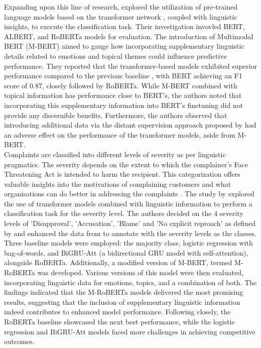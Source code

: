 Expanding upon this line of research, \cite{jin_complaint_2020} explored the utilization of pre-trained language models based on the transformer network \cite{vaswaniAttentionAllYou2023a}, coupled with linguistic insights, to execute the classification task. Their investigation invovled BERT, ALBERT, and RoBERTa models for evaluation. The introduction of Multimodal BERT (M-BERT) aimed to gauge how incorporating supplementary linguistic details related to emotions and topical themes could influence predictive performance. They reported that the transformer-based models exhibited superior performance compared to the previous baseline \cite{preotiuc-pietro_automatically_2019}, with BERT achieving an F1 score of 0.87, closely followed by RoBERTa. While M-BERT combined with topical information has performance close to BERT's, the authors noted that incorporating this supplementary information into BERT's finetuning did not provide any discernible benefits. Furthermore, the authors observed that introducing additional data via the distant supervision approach proposed by \cite{preotiuc-pietro_automatically_2019} had an adverse effect on the performance of the transformer models, aside from M-BERT.\\

Complaints are classified into different levels of severity as per linguistic pragmatics. The severity depends on the extent to which the complainer's Face Threatening Act is intended to harm the recipient. This categorization offers valuable insights into the motivations of complaining customers and what organisations can do better in addressing the complaints \cite{jinModelingSeverityComplaints2021}. The study by \cite{jinModelingSeverityComplaints2021} explored the use of transformer models combined with linguistic information to perform a classification task for the severity level. The authors decided on the 4 severity levels of 'Disapproval', 'Accusation', 'Blame' and 'No explicit reproach' as defined by \cite{trosborg2011interlanguage} and enhanced the data from \cite{preotiuc-pietro_automatically_2019} to annotate with the severity levels as the classes. Three baseline models were employed: the majority class, logistic regression with bag-of-words, and BiGRU-Att (a bidirectional GRU model with self-attention), alongside RoBERTa. Additionally, a modified version of M-BERT, termed M-RoBERTa was developed. Various versions of this model were then evaluated, incorporating linguistic data for emotions, topics, and a combination of both. The findings indicated that the M-RoBERTa models delivered the most promising results, suggesting that the inclusion of supplementary linguistic information indeed contributes to enhanced model performance. Following closely, the RoBERTa baseline showcased the next best performance, while the logistic regression and BiGRU-Att models faced more challenges in achieving competitive outcomes.